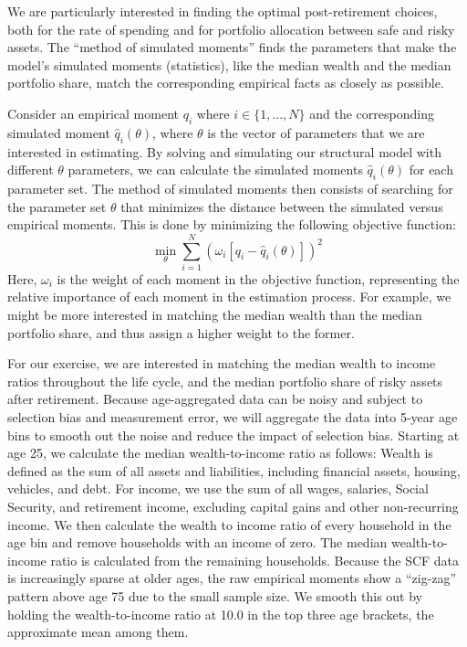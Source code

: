 \documentclass{article}
\begin{document}
We are particularly interested in finding the optimal post-retirement choices, both for the rate of spending and for portfolio allocation between safe and risky assets.
The ``method of simulated moments'' finds the parameters that make the model's simulated moments (statistics), like the median wealth and the median portfolio share, match the corresponding empirical facts as closely as possible.

Consider an empirical moment $q_i$ where $i \in \{1,...,N\}$ and the corresponding simulated moment $\hat{q}_i(\theta)$, where $\theta$ is the vector of parameters that we are interested in estimating.
By solving and simulating our structural model with different $\theta$ parameters, we can calculate the simulated moments $\hat{q}_i(\theta)$ for each parameter set.
The method of simulated moments then consists of searching for the parameter set $\theta$ that minimizes the distance between the simulated versus empirical moments.
This is done by minimizing the following objective function:
\begin{equation}
\min_{\theta} \sum_{i=1}^{N}  \left( \omega_i [q_i - \hat{q}_i(\theta) ] \right)^2
\end{equation}
Here, $\omega_i$ is the weight of each moment in the objective function, representing the relative importance of each moment in the estimation process.
For example, we might be more interested in matching the median wealth than the median portfolio share, and thus assign a higher weight to the former.

For our exercise, we are interested in matching the median wealth to income ratios throughout the life cycle, and the median portfolio share of risky assets after retirement.
Because age-aggregated data can be noisy and subject to selection bias and measurement error, we will aggregate the data into 5-year age bins to smooth out the noise and reduce the impact of selection bias.
Starting at age 25, we calculate the median wealth-to-income ratio as follows: Wealth is defined as the sum of all assets and liabilities, including financial assets, housing, vehicles, and debt.
For income, we use the sum of all wages, salaries, Social Security, and retirement income, excluding capital gains and other non-recurring income.
We then calculate the wealth to income ratio of every household in the age bin and remove households with an income of zero.
The median wealth-to-income ratio is calculated from the remaining households.
Because the SCF data is increasingly sparse at older ages, the raw empirical moments show a ``zig-zag'' pattern above age 75 due to the small sample size.
We smooth this out by holding the wealth-to-income ratio at 10.0 in the top three age brackets, the approximate mean among them.
\end{document}
